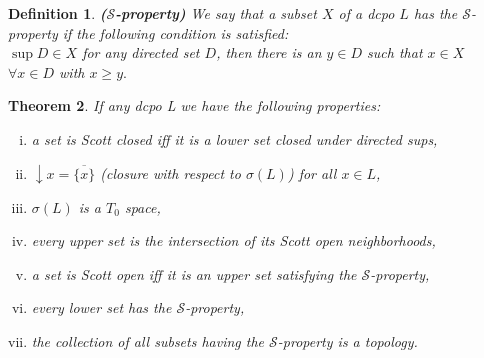 \documentclass[a4paper,12pt]{article}
\newtheorem{theorem}{Theorem}[section]
\newtheorem{definition}[theorem]{Definition}
\begin{document}
\begin{definition}\textbf{($\mathcal{S}$-property)}
We say that a subset $X$ of a dcpo $L$ has the $\mathcal{S}$-property if the following condition is satisfied:\\
 
 $\sup D \in X$ for any directed set $D$, then there is an $y \in D$ such that $x \in X$ $\forall x \in D$ with $x \geq y.$
\end{definition}

\begin{theorem}\label{lijstdcpo} If any dcpo L we have the following properties:
\begin{enumerate}[(i)]
    \item a set is Scott closed iff it is a lower set closed under directed sups,
    \item $\downarrow x = \overline{\{x\}}$ (closure with respect to $\sigma(L)$) for all $x \in L$,
    \item $\sigma(L)$ is a $T_0$ space,
    \item every upper set is the intersection of its Scott open neighborhoods,
    \item a set is Scott open iff it is an upper set satisfying the $\mathcal{S}$-property,
    \item every lower set has the $\mathcal{S}$-property,
    \item the collection of all subsets having the $\mathcal{S}$-property is a topology.
\end{enumerate}
\end{theorem}
\end{document}

